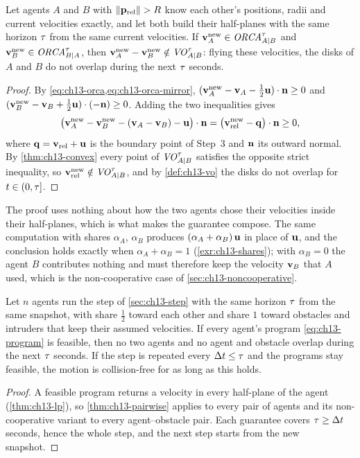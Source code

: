 \begin{theorem}
\label{thm:ch13-pairwise}
Let agents $A$ and $B$ with $\left\lVert \mathbf{p}_{\mathrm{rel}} \right\rVert > R$ know each
other's positions, radii and current velocities exactly, and let both
build their half-planes with the same horizon $\tau$ from the same current
velocities. If $\mathbf{v}_A^{\mathrm{new}} \in \mathit{ORCA}^{\tau}_{A|B}$ and
$\mathbf{v}_B^{\mathrm{new}} \in \mathit{ORCA}^{\tau}_{B|A}$, then
$\mathbf{v}_A^{\mathrm{new}} - \mathbf{v}_B^{\mathrm{new}} \notin \mathit{VO}^{\tau}_{A|B}$:
flying these velocities, the disks of $A$ and $B$ do not overlap during the
next $\tau$ seconds.
\end{theorem}
\begin{proof}
By \cref{eq:ch13-orca,eq:ch13-orca-mirror},
$(\mathbf{v}_A^{\mathrm{new}} - \mathbf{v}_A - \tfrac12\mathbf{u})\cdot\mathbf{n} \ge 0$ and
$(\mathbf{v}_B^{\mathrm{new}} - \mathbf{v}_B + \tfrac12\mathbf{u})\cdot(-\mathbf{n}) \ge 0$.
Adding the two inequalities gives
\[
  \bigl(\mathbf{v}_A^{\mathrm{new}} - \mathbf{v}_B^{\mathrm{new}} - (\mathbf{v}_A - \mathbf{v}_B) - \mathbf{u}\bigr)\cdot\mathbf{n}
  = \bigl(\mathbf{v}_{\mathrm{rel}}^{\mathrm{new}} - \mathbf{q}\bigr)\cdot\mathbf{n} \ge 0,
\]
where $\mathbf{q} = \mathbf{v}_{\mathrm{rel}} + \mathbf{u}$ is the boundary point of
Step~3 and $\mathbf{n}$ its outward normal. By \cref{thm:ch13-convex} every
point of $\mathit{VO}^{\tau}_{A|B}$ satisfies the opposite strict inequality, so
$\mathbf{v}_{\mathrm{rel}}^{\mathrm{new}} \notin \mathit{VO}^{\tau}_{A|B}$, and by
\cref{def:ch13-vo} the disks do not overlap for $t \in (0, \tau]$.
\end{proof}

The proof uses nothing about how the two agents chose their velocities
inside their half-planes, which is what makes the guarantee compose. The
same computation with shares $\alpha_A$, $\alpha_B$ produces
$(\alpha_A + \alpha_B)\,\mathbf{u}$ in place of $\mathbf{u}$, and the conclusion
holds exactly when $\alpha_A + \alpha_B = 1$ (\cref{exr:ch13-shares}); with
$\alpha_B = 0$ the agent $B$ contributes nothing and must therefore keep the
velocity $\mathbf{v}_B$ that $A$ used, which is the non-cooperative case of
\cref{sec:ch13-noncooperative}.

\begin{corollary}
\label{thm:ch13-nbody}
Let $n$ agents run the step of \cref{sec:ch13-step} with the same horizon $\tau$ from
the same snapshot, with share $\tfrac12$ toward each other and share $1$
toward obstacles and intruders that keep their assumed velocities. If every
agent's program \cref{eq:ch13-program} is feasible, then no two agents and
no agent and obstacle overlap during the next $\tau$ seconds. If the step is
repeated every $\Delta t \le \tau$ and the programs stay feasible, the motion is
collision-free for as long as this holds.
\end{corollary}
\begin{proof}
A feasible program returns a velocity in every half-plane of the agent
(\cref{thm:ch13-lp}), so \cref{thm:ch13-pairwise} applies to every pair
of agents and its non-cooperative variant to every agent--obstacle pair.
Each guarantee covers $\tau \ge \Delta t$ seconds, hence the whole step, and
the next step starts from the new snapshot.
\end{proof}

